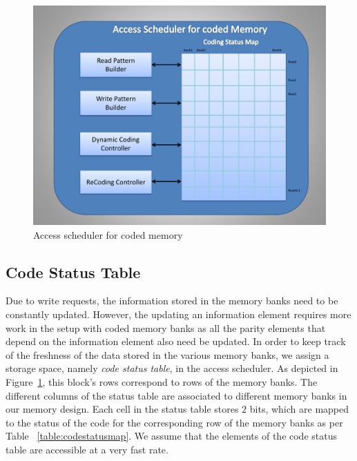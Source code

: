 \begin{figure}[tbp]
\centering
\includegraphics[width=0.7\linewidth]{fig/coded_access_scheduler.pdf}
\caption{
{Access scheduler for coded memory} }
\label{fig:coded_access_scheduler}
\end{figure}
\subsection{Code Status Table}
\label{sec:codeStatusTable}
Due to write requests, the information stored in the memory banks need to be constantly updated. However, the updating an information element requires more work in the setup with coded memory banks as all the parity elements that depend on the information element also need be updated. In order to keep track of the freshness of the data stored in the various memory banks, we assign a storage space, namely {\em code status table}, in the access scheduler. As depicted in Figure~\ref{fig:coded_access_scheduler}, this block's rows correspond to rows of the memory banks. The different columns of the status table are associated to different memory banks in our memory design.  Each cell in the status table stores $2$ bits, which are mapped to the status of the code for the corresponding row of the memory banks as per Table ~\ref{table:codestatusmap}. We assume that the elements of the code status table are accessible at a very fast rate. %


